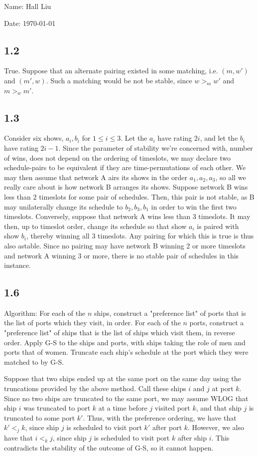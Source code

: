 \documentclass{article}
\begin{document}
Name: Hall Liu

Date: \today 
\vspace{1.5cm}

\subsection*{1.2}
True. Suppose that an alternate pairing existed in some matching, i.e. $(m,w')$ and $(m',w)$. Such a matching would be not be stable, since $w>_mw'$ and $m>_wm'$. 
\subsection*{1.3}
Consider six shows, $a_i,b_i$ for $1\leq i\leq3$. Let the $a_i$ have rating $2i$, and let the $b_i$ have rating $2i-1$. Since the parameter of stability we're concerned with, number of wins, does not depend on the ordering of timeslots, we may declare two schedule-pairs to be equivalent if they are time-permutations of each other. We may then assume that network A airs its shows in the order $a_1,a_2,a_3$, so all we really care about is how network B arranges its shows. Suppose network B wins less than $2$ timeslots for some pair of schedules. Then, this pair is not stable, as B may unilaterally change its schedule to $b_2,b_3,b_1$ in order to win the first two timeslots. Conversely, suppose that network A wins less than $3$ timeslots. It may then, up to timeslot order, change its schedule so that show $a_i$ is paired with show $b_i$, thereby winning all $3$ timeslots. Any pairing for which this is true is thus also astable. Since no pairing may have network B winning 2 or more timeslots and network A winning 3 or more, there is no stable pair of schedules in this instance.
\subsection*{1.6}
Algorithm: For each of the $n$ ships, construct a "preference list" of ports that is the list of ports which they visit, in order. For each of the $n$ ports, construct a "preference list" of ships that is the list of ships which visit them, in reverse order. Apply G-S to the ships and ports, with ships taking the role of men and ports that of women. Truncate each ship's schedule at the port which they were matched to by G-S.

Suppose that two ships ended up at the same port on the same day using the truncations provided by the above method. Call these ships $i$ and $j$ at port $k$. Since no two ships are truncated to the same port, we may assume WLOG that ship $i$ was truncated to port $k$ at a time before $j$ visited port $k$, and that ship $j$ is truncated to some port $k'$. Thus, with the preference ordering, we have that $k'<_jk$, since ship $j$ is scheduled to visit port $k'$ after port $k$. However, we also have that $i<_kj$, since ship $j$ is scheduled to visit port $k$ after ship $i$. This contradicts the stability of the outcome of G-S, so it cannot happen. 
\end{document}
